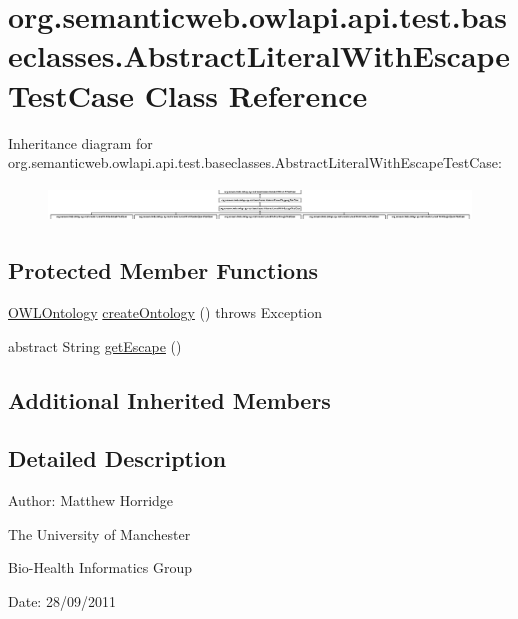 \hypertarget{classorg_1_1semanticweb_1_1owlapi_1_1api_1_1test_1_1baseclasses_1_1_abstract_literal_with_escape_test_case}{\section{org.\-semanticweb.\-owlapi.\-api.\-test.\-baseclasses.\-Abstract\-Literal\-With\-Escape\-Test\-Case Class Reference}
\label{classorg_1_1semanticweb_1_1owlapi_1_1api_1_1test_1_1baseclasses_1_1_abstract_literal_with_escape_test_case}
}
Inheritance diagram for org.\-semanticweb.\-owlapi.\-api.\-test.\-baseclasses.\-Abstract\-Literal\-With\-Escape\-Test\-Case\-:\begin{figure}[H]
\begin{center}
\leavevmode
\includegraphics[height=0.941176cm]{classorg_1_1semanticweb_1_1owlapi_1_1api_1_1test_1_1baseclasses_1_1_abstract_literal_with_escape_test_case}
\end{center}
\end{figure}
\subsection*{Protected Member Functions}
\begin{DoxyCompactItemize}
\item 
\hyperlink{interfaceorg_1_1semanticweb_1_1owlapi_1_1model_1_1_o_w_l_ontology}{O\-W\-L\-Ontology} \hyperlink{classorg_1_1semanticweb_1_1owlapi_1_1api_1_1test_1_1baseclasses_1_1_abstract_literal_with_escape_test_case_a03de916b18b5e62a5032abd7209ba8d7}{create\-Ontology} ()  throws Exception 
\item 
abstract String \hyperlink{classorg_1_1semanticweb_1_1owlapi_1_1api_1_1test_1_1baseclasses_1_1_abstract_literal_with_escape_test_case_a522136ed23c4287bc064449bb366f8bb}{get\-Escape} ()
\end{DoxyCompactItemize}
\subsection*{Additional Inherited Members}


\subsection{Detailed Description}
Author\-: Matthew Horridge\par
 The University of Manchester\par
 Bio-\/\-Health Informatics Group\par
 Date\-: 28/09/2011 


